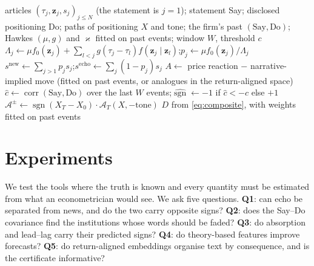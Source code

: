 \documentclass{article}
\theoremstyle{plain}
\theoremstyle{definition}
\theoremstyle{remark}
\newcommand{\z}{\bm{z}}
\DeclareMathOperator{\sgn}{sgn}
\begin{document}
\begin{algorithm}[t]
\caption{Say--Echo--Do scoring of one event (all inputs available at decision time)}
\label{alg:score}
\small
\begin{algorithmic}[1]
\Require articles $(\tau_j,\z_j,s_j)_{j\le N}$ (the statement is $j=1$); statement Say; disclosed positioning Do; paths of positioning $X$ and tone; the firm's past $(\text{Say},\text{Do})$; Hawkes $(\mu,g)$ and $\varkappa$ fitted on past events; window $W$, threshold $c$
 
  \State $\Lambda_j\gets\mu f_0(\z_j)+\sum_{l<j}g(\tau_j-\tau_l)f(\z_j\mid\z_l)$;\quad $p_j\gets\mu f_0(\z_j)/\Lambda_j$
\EndFor
\State $s^{\text{new}}\gets\sum_{j>1}p_js_j$;\quad $s^{\text{echo}}\gets\sum_j(1-p_j)s_j$ 
\State $A\gets$ price reaction $-$ narrative-implied move (fitted on past events, or analogues in the return-aligned space)
\State $\hat c\gets\operatorname{corr}(\text{Say},\text{Do})$ over the last $W$ events;\quad $\widehat{\sgn}\gets-1$ if $\hat c<-c$ else $+1$ 
\State $\mathcal{A}^{\pm}\gets\sgn(X_T-X_0)\cdot\mathcal{A}_T(X,-\text{tone})$ 
\State \Return $D$ from \eqref{eq:composite}, with weights fitted on past events
\end{algorithmic}
\end{algorithm}

\section{Experiments}\label{sec:experiments}

We test the tools where the truth is known and every quantity must be estimated from what an econometrician would see. We ask five questions. \textbf{Q1}: can echo be separated from news, and do the two carry opposite signs? \textbf{Q2}: does the Say--Do covariance find the institutions whose words should be faded? \textbf{Q3}: do absorption and lead--lag carry their predicted signs? \textbf{Q4}: do theory-based features improve forecasts? \textbf{Q5}: do return-aligned embeddings organise text by consequence, and is the certificate informative?
\end{document}
